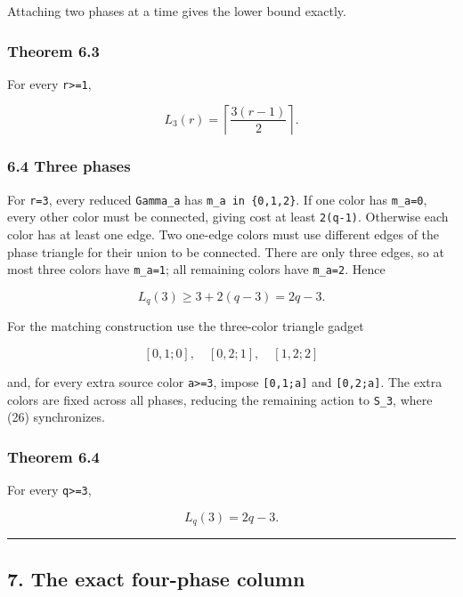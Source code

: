 Attaching two phases at a time gives the lower bound exactly.

\hypertarget{theorem-6.3}{%
\subsubsection{Theorem 6.3}\label{theorem-6.3}}

For every \texttt{r\textgreater{}=1},

\[
\boxed{
L_3(r)=\left\lceil\frac{3(r-1)}2\right\rceil.
}
\tag{24}
\]

\hypertarget{three-phases}{%
\subsubsection{6.4 Three phases}\label{three-phases}}

For \texttt{r=3}, every reduced \texttt{Gamma\_a} has
\texttt{m\_a\ in\ \{0,1,2\}}. If one color has \texttt{m\_a=0}, every
other color must be connected, giving cost at least \texttt{2(q-1)}.
Otherwise each color has at least one edge. Two one-edge colors must use
different edges of the phase triangle for their union to be connected.
There are only three edges, so at most three colors have
\texttt{m\_a=1}; all remaining colors have \texttt{m\_a=2}. Hence

\[
L_q(3)\ge3+2(q-3)=2q-3.
\tag{25}
\]

For the matching construction use the three-color triangle gadget

\[
[0,1;0],\quad[0,2;1],\quad[1,2;2]
\tag{26}
\]

and, for every extra source color \texttt{a\textgreater{}=3}, impose
\texttt{{[}0,1;a{]}} and \texttt{{[}0,2;a{]}}. The extra colors are
fixed across all phases, reducing the remaining action to \texttt{S\_3},
where (26) synchronizes.

\hypertarget{theorem-6.4}{%
\subsubsection{Theorem 6.4}\label{theorem-6.4}}

For every \texttt{q\textgreater{}=3},

\[
\boxed{L_q(3)=2q-3.}
\tag{27}
\]

\begin{center}\rule{0.5\linewidth}{0.5pt}\end{center}

\hypertarget{the-exact-four-phase-column}{%
\subsection{7. The exact four-phase
column}\label{the-exact-four-phase-column}}

